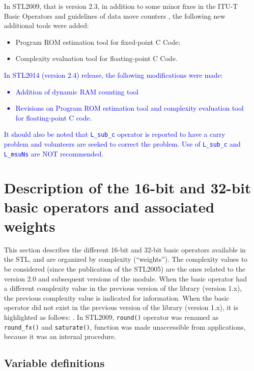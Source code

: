 In STL2009, that is version 2.3, in addition to some minor fixes in
the ITU-T Basic Operators and guidelines of data move counters , the
following new additional tools were added:
\begin{itemize}
\item Program ROM estimation tool for fixed-point C Code;
\item Complexity evaluation tool for floating-point C Code.
\end{itemize}

\textcolor{blue}{
In STL2014 (version 2.4) release, the following modifications were made:
\begin{itemize}
\item Addition of dynamic RAM counting tool
\item Revisions on Program ROM estimation tool and complexity
  evaluation tool for floating-point C code.
\end{itemize}
It should also be noted that {\tt L\_sub\_c} operator is reported to
have a carry problem and volunteers are seeked to correct the
problem. Use of {\tt L\_sub\_c} and {\tt L\_msuNs} are NOT recommended.
}

\section{Description of the 16-bit and 32-bit basic operators and 
associated weights}

This section describes the different 16-bit and 32-bit basic operators
available in the STL, and are organized by complexity
(``weights''). The complexity values to be considered (since the
publication of the STL2005) are the ones related to the version 2.0
and subsequent versions of the module. When the basic operator had a
different complexity value in the previous version of the library
(version 1.x), the previous complexity value is indicated for
information.  When the basic operator did not exist in the previous
version of the library (version 1.x), it is highlighted as follows:
 . In STL2009, {\tt round()} operator was renamed as {\tt
  round\_fx()} and {\tt saturate()}, function was made unaccessible
from applications, because it was an internal procedure.

\subsection{Variable definitions}

